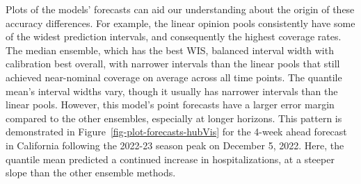 \documentclass[
  letterpaper,
  DIV=11,
  numbers=noendperiod]{scrartcl}
\begin{document}
Plots of the models' forecasts can aid our understanding about the
origin of these accuracy differences. For example, the linear opinion
pools consistently have some of the widest prediction intervals, and
consequently the highest coverage rates. The median ensemble, which has
the best WIS, balanced interval width with calibration best overall,
with narrower intervals than the linear pools that still achieved
near-nominal coverage on average across all time points. The quantile
mean's interval widths vary, though it usually has narrower intervals
than the linear pools. However, this model's point forecasts have a
larger error margin compared to the other ensembles, especially at
longer horizons. This pattern is demonstrated in
Figure~\ref{fig-plot-forecasts-hubVis} for the 4-week ahead forecast in
California following the 2022-23 season peak on December 5, 2022. Here,
the quantile mean predicted a continued increase in hospitalizations, at
a steeper slope than the other ensemble methods.
\end{document}
